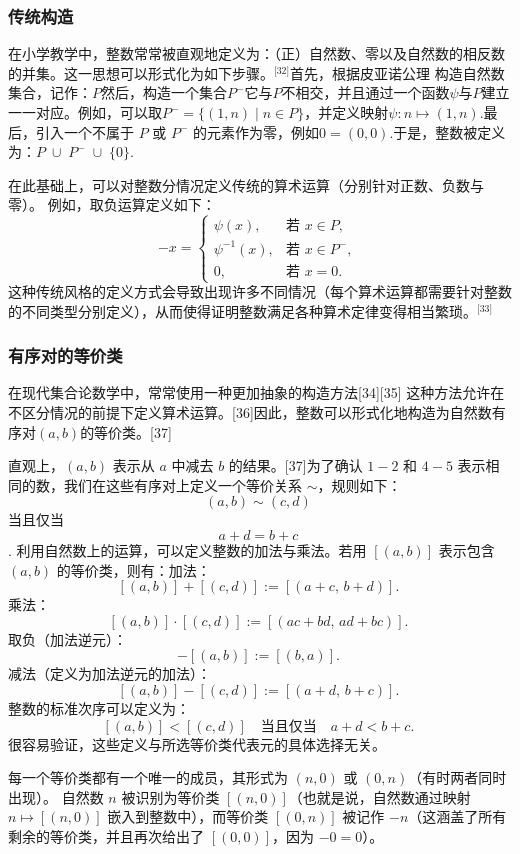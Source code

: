 \subsubsection{传统构造}
在小学教学中，整数常常被直观地定义为：（正）自然数、零以及自然数的相反数的并集。这一思想可以形式化为如下步骤。\(^\text{[32]}\)首先，根据皮亚诺公理 构造自然数集合，记作：$P$然后，构造一个集合$P^{-}$它与$P$不相交，并且通过一个函数$\psi$与$P$建立一一对应。例如，可以取$P^{-} = \{(1,n) \mid n \in P\}$，并定义映射$\psi : n \mapsto (1,n)$.最后，引入一个不属于 $P$ 或 $P^{-}$ 的元素作为零，例如$0 = (0,0)$.于是，整数被定义为：$P \;\cup\; P^{-} \;\cup\; \{0\}$.

在此基础上，可以对整数分情况定义传统的算术运算（分别针对正数、负数与零）。
例如，取负运算定义如下：
$$
-x =
\begin{cases}
\psi(x), & \text{若 } x \in P, \\[6pt]
\psi^{-1}(x), & \text{若 } x \in P^{-}, \\[6pt]
0, & \text{若 } x = 0.
\end{cases}~
$$
这种传统风格的定义方式会导致出现许多不同情况（每个算术运算都需要针对整数的不同类型分别定义），从而使得证明整数满足各种算术定律变得相当繁琐。\(^\text{[33]}\)
\subsubsection{有序对的等价类}
在现代集合论数学中，常常使用一种更加抽象的构造方法[34][35] 这种方法允许在不区分情况的前提下定义算术运算。[36]因此，整数可以形式化地构造为自然数有序对$(a,b)$的等价类。[37]

直观上，$(a,b)$ 表示从 $a$ 中减去 $b$ 的结果。[37]为了确认 $1-2$ 和 $4-5$ 表示相同的数，我们在这些有序对上定义一个等价关系 $\sim$，规则如下：
$$(a,b) \sim (c,d)~$$
当且仅当
$$a+d = b+c~$$.
利用自然数上的运算，可以定义整数的加法与乘法。若用 $[(a,b)]$ 表示包含 $(a,b)$ 的等价类，则有：加法：
$$
[(a,b)] + [(c,d)] := [(a+c,\, b+d)].~
$$
乘法：
$$
[(a,b)] \cdot [(c,d)] := [(ac+bd,\, ad+bc)].~
$$
取负（加法逆元）：
$$
-[(a,b)] := [(b,a)].~
$$
减法（定义为加法逆元的加法）：
$$
[(a,b)] - [(c,d)] := [(a+d,\, b+c)].~
$$
整数的标准次序可以定义为：
$$
[(a,b)] < [(c,d)] \quad \text{当且仅当} \quad a+d < b+c.~
$$
很容易验证，这些定义与所选等价类代表元的具体选择无关。

每一个等价类都有一个唯一的成员，其形式为 $(n,0)$ 或 $(0,n)$（有时两者同时出现）。
自然数 $n$ 被识别为等价类 $[(n,0)]$（也就是说，自然数通过映射 $n \mapsto [(n,0)]$ 嵌入到整数中），而等价类 $[(0,n)]$ 被记作 $-n$（这涵盖了所有剩余的等价类，并且再次给出了 $[(0,0)]$，因为 $-0 = 0$）。

